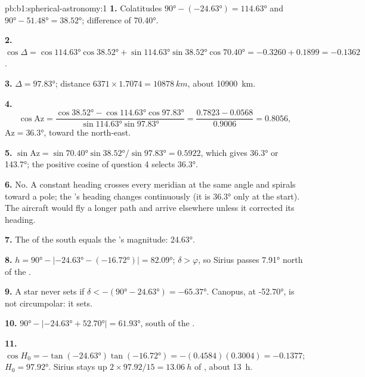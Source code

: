 \begin{solution}{pb:b1:spherical-astronomy:1}
\textbf{1.} Colatitudes $\ang{90} - (\ang{-24.63}) = \ang{114.63}$ and
$\ang{90} - \ang{51.48} = \ang{38.52}$; difference of  \ang{70.40}.

\textbf{2.} $\cos\Delta = \cos\ang{114.63}\cos\ang{38.52} +
\sin\ang{114.63}\sin\ang{38.52}\cos\ang{70.40} = -0.3260 + 0.1899 =
-0.1362$.

\textbf{3.} $\Delta = \ang{97.83}$; distance $6371\times1.7074 =
\qty{10878}{km}$, about \qty{10900}{km}.

\textbf{4.}
\[
  \cos\mathrm{Az} = \frac{\cos\ang{38.52} - \cos\ang{114.63}\cos\ang{97.83}}
  {\sin\ang{114.63}\sin\ang{97.83}} = \frac{0.7823 - 0.0568}{0.9006} = 0.8056 ,
\]
$\mathrm{Az} = \ang{36.3}$, toward the north-east.

\textbf{5.} $\sin\mathrm{Az} = \sin\ang{70.40}\sin\ang{38.52}/\sin\ang{97.83}
= 0.5922$, which gives \ang{36.3} or \ang{143.7}; the positive cosine of
question 4 selects \ang{36.3}.

\textbf{6.} No. A constant heading crosses every meridian at the same angle
and spirals toward a pole; the 's heading changes continuously
(it is \ang{36.3} only at the start). The aircraft would fly a longer path
and arrive elsewhere unless it corrected its heading.

\textbf{7.} The  of the south  equals the 's
magnitude: \ang{24.63}.

\textbf{8.} $h = \ang{90} - |\ang{-24.63} - (\ang{-16.72})| = \ang{82.09}$;
$\delta > \varphi$, so Sirius passes \ang{7.91} north of the .

\textbf{9.} A star never sets if $\delta < -(\ang{90} - \ang{24.63}) =
\ang{-65.37}$. Canopus, at \ang{-52.70}, is not circumpolar: it sets.

\textbf{10.} $\ang{90} - |\ang{-24.63} + \ang{52.70}| = \ang{61.93}$, south
of the .

\textbf{11.} $\cos H_0 = -\tan(\ang{-24.63})\tan(\ang{-16.72}) =
-(0.4584)(0.3004) = -0.1377$; $H_0 = \ang{97.92}$. Sirius stays up
$2\times97.92/15 = \qty{13.06}{h}$ of , about \qty{13}{h}.


\end{solution}
